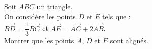 \begin{exercice}
Soit $ABC$ un triangle.\\
On considère les points $D$ et $E$ tels que :\\
$\overrightarrow{BD}=\dfrac{1}{3}\overrightarrow{BC}$ et $\overrightarrow{AE}=\overrightarrow{AC}+2\overrightarrow{AB}$.\\
Montrer que les points $A$, $D$ et $E$ sont alignés.
\end{exercice} 







